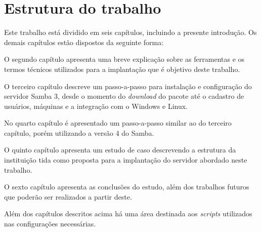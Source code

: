 \section{Estrutura do trabalho}

Este trabalho está dividido em seis capítulos, incluindo a presente introdução. Os demais capítulos estão dispostos da seguinte forma:

O segundo capítulo apresenta uma breve explicação sobre as ferramentas e os termos técnicos utilizados para a implantação que é objetivo deste trabalho. 

O terceiro capítulo descreve um passo-a-passo para instalação e configuração do servidor Samba 3, desde o momento do \textit{download} do pacote até o cadastro de usuários, máquinas e a integração com o Windows e Linux.

No quarto capítulo é apresentado um passo-a-passo similar ao do terceiro capítulo, porém utilizando a versão 4 do Samba.

O quinto capítulo apresenta um estudo de caso descrevendo a estrutura da instituição tida como proposta para a implantação do servidor abordado neste trabalho.

O sexto capítulo apresenta as conclusões do estudo, além dos trabalhos futuros que poderão ser realizados a partir deste.

Além dos capítulos descritos acima há uma área destinada aos \textit{scripts} utilizados nas configurações necessárias.